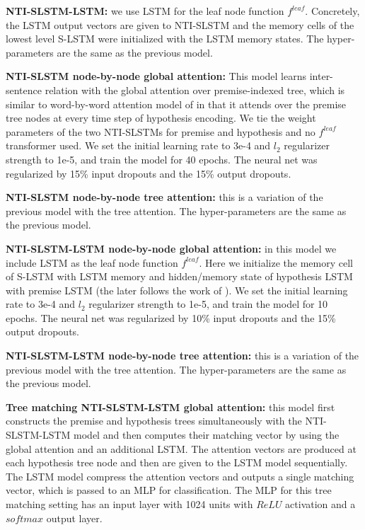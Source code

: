\documentclass[11pt]{article}
\begin{document}
\textbf{NTI-SLSTM-LSTM:} we use LSTM for the leaf node function $f^{leaf}$. Concretely, the LSTM output vectors are given to NTI-SLSTM and the memory cells of the lowest level S-LSTM were initialized with the LSTM memory states. The hyper-parameters are the same as the previous model.





\textbf{NTI-SLSTM node-by-node global attention:} This model learns inter-sentence relation with the global attention over premise-indexed tree, which is similar to word-by-word attention model of  in that it attends over the premise tree nodes at every time step of hypothesis encoding. We tie the weight parameters of the two NTI-SLSTMs for premise and hypothesis and no $f^{leaf}$ transformer used. We set the initial learning rate to 3e-4 and $l_2$ regularizer strength to 1e-5, and train the model for 40 epochs. The neural net was regularized by 15\% input dropouts and the 15\% output dropouts.


\textbf{NTI-SLSTM node-by-node tree attention:} this is a variation of the previous model with the tree attention. The hyper-parameters are the same as the previous model.

\textbf{NTI-SLSTM-LSTM node-by-node global attention:} in this model we include LSTM as the leaf node function $f^{leaf}$. Here we initialize the memory cell of S-LSTM with LSTM memory and hidden/memory state of hypothesis LSTM with premise LSTM (the later follows the work of \cite{rocktaschel:16}). We set the initial learning rate to 3e-4 and $l_2$ regularizer strength to 1e-5, and train the model for 10 epochs. The neural net was regularized by 10\% input dropouts and the 15\% output dropouts.

\textbf{NTI-SLSTM-LSTM node-by-node tree attention:} this is a variation of the previous model with the tree attention. The hyper-parameters are the same as the previous model.

\textbf{Tree matching NTI-SLSTM-LSTM global attention:} this model first constructs the premise and hypothesis trees simultaneously with the NTI-SLSTM-LSTM model and then computes their matching vector by using the global attention and an additional LSTM. The attention vectors are produced at each hypothesis tree node and then are given to the LSTM model sequentially. The LSTM model compress the attention vectors and outputs a single matching vector, which is passed to an MLP for classification. The MLP for this tree matching setting has an input layer with 1024 units with $ReLU$ activation and a $softmax$ output layer.
\end{document}
